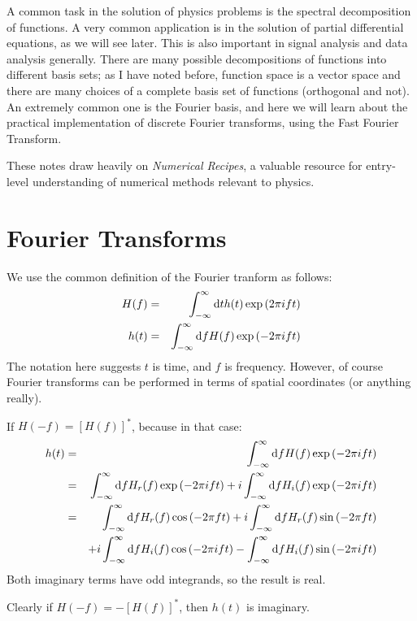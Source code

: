 A common task in the solution of physics problems is the spectral
decomposition of functions. A very common application is in the
solution of partial differential equations, as we will see later. This
is also important in signal analysis and data analysis
generally. There are many possible decompositions of functions into
different basis sets; as I have noted before, function space is a
vector space and there are many choices of a complete basis set of
functions (orthogonal and not).  An extremely common one is the
Fourier basis, and here we will learn about the practical
implementation of discrete Fourier transforms, using the Fast Fourier
Transform.

These notes draw heavily on {\it Numerical Recipes}, a valuable
resource for entry-level understanding of numerical methods relevant
to physics.

\section{Fourier Transforms}

We use the common definition of the Fourier tranform as follows:
\begin{eqnarray}
H(f) &=& \int_{-\infty}^{\infty} {\rm d}t h(t) \exp\left(2\pi i f t\right) \cr
h(t) &=& \int_{-\infty}^{\infty} {\rm d}f H(f) \exp\left(- 2\pi i f t\right)
\end{eqnarray}
The notation here suggests $t$ is time, and $f$ is frequency. However,
of course Fourier transforms can be performed in terms of spatial
coordinates (or anything really).


\begin{answer}
If $H(-f) =  [H(f)]^\ast$, because in that case:
\begin{eqnarray}
h(t) &=& \int_{-\infty}^{\infty} {\rm d}f H(f) \exp\left(- 2\pi i f t\right) \cr
&=& \int_{-\infty}^{\infty} {\rm d}f H_r(f) \exp\left(- 2\pi i f t\right)
+ i \int_{-\infty}^{\infty} {\rm d}f H_i(f) \exp\left(- 2\pi i f
t\right) \cr
&=& \int_{-\infty}^{\infty} {\rm d}f H_r(f) \cos\left(- 2\pi f t\right)
+ i \int_{-\infty}^{\infty} {\rm d}f H_r(f) \sin\left(- 2\pi f
t\right) \cr
&& + i \int_{-\infty}^{\infty} {\rm d}f H_i(f) \cos\left(- 2\pi i f t\right)
- \int_{-\infty}^{\infty} {\rm d}f H_i(f) \sin\left(- 2\pi i f t\right)
\end{eqnarray}
Both imaginary terms have odd integrands, so the result is real.

Clearly if $H(-f) = -[H(f)]^\ast$, then $h(t)$ is imaginary. 
\end{answer}

